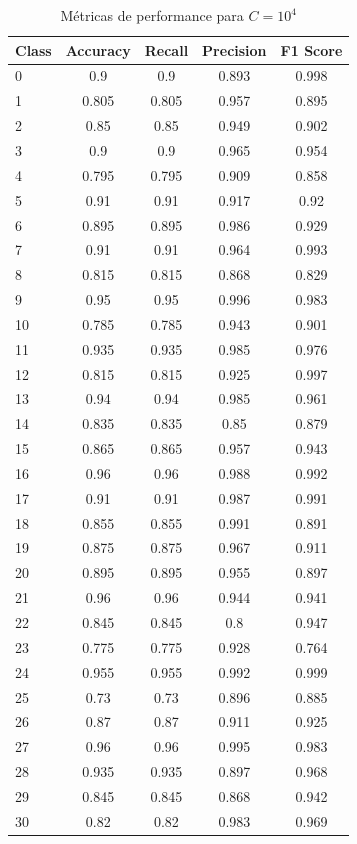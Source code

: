 \begin{table}[!t]
\caption{Métricas de performance para $C = 10^{4}$}
\begin{center}
\begin{tabular}{l c c c c}
Class & Accuracy & Recall & Precision & F1 Score\\ \hline
0 & 0.9 & 0.9 & 0.893 & 0.998\\
1 & 0.805 & 0.805 & 0.957 & 0.895\\
2 & 0.85 & 0.85 & 0.949 & 0.902\\
3 & 0.9 & 0.9 & 0.965 & 0.954\\
4 & 0.795 & 0.795 & 0.909 & 0.858\\
5 & 0.91 & 0.91 & 0.917 & 0.92\\
6 & 0.895 & 0.895 & 0.986 & 0.929\\
7 & 0.91 & 0.91 & 0.964 & 0.993\\
8 & 0.815 & 0.815 & 0.868 & 0.829\\
9 & 0.95 & 0.95 & 0.996 & 0.983\\
10 & 0.785 & 0.785 & 0.943 & 0.901\\
11 & 0.935 & 0.935 & 0.985 & 0.976\\
12 & 0.815 & 0.815 & 0.925 & 0.997\\
13 & 0.94 & 0.94 & 0.985 & 0.961\\
14 & 0.835 & 0.835 & 0.85 & 0.879\\
15 & 0.865 & 0.865 & 0.957 & 0.943\\
16 & 0.96 & 0.96 & 0.988 & 0.992\\
17 & 0.91 & 0.91 & 0.987 & 0.991\\
18 & 0.855 & 0.855 & 0.991 & 0.891\\
19 & 0.875 & 0.875 & 0.967 & 0.911\\
20 & 0.895 & 0.895 & 0.955 & 0.897\\
21 & 0.96 & 0.96 & 0.944 & 0.941\\
22 & 0.845 & 0.845 & 0.8 & 0.947\\
23 & 0.775 & 0.775 & 0.928 & 0.764\\
24 & 0.955 & 0.955 & 0.992 & 0.999\\
25 & 0.73 & 0.73 & 0.896 & 0.885\\
26 & 0.87 & 0.87 & 0.911 & 0.925\\
27 & 0.96 & 0.96 & 0.995 & 0.983\\
28 & 0.935 & 0.935 & 0.897 & 0.968\\
29 & 0.845 & 0.845 & 0.868 & 0.942\\
30 & 0.82 & 0.82 & 0.983 & 0.969\\

\end{tabular}
\end{center}
\end{table}
